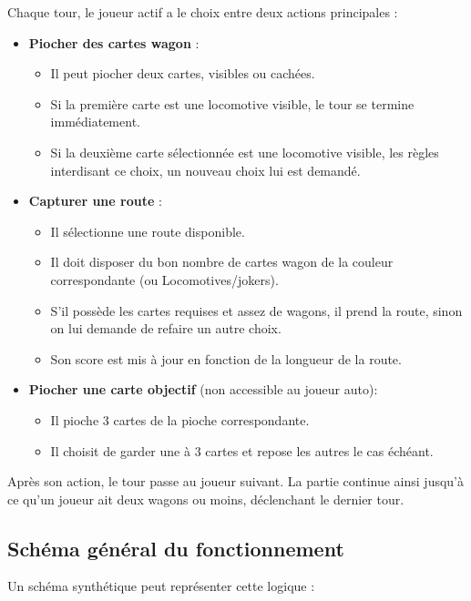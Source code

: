 \documentclass[a4paper,12pt]{report}
\begin{document}
Chaque tour, le joueur actif a le choix entre deux actions principales :
\begin{itemize}
    \item \textbf{Piocher des cartes wagon} :
        \begin{itemize}
            \item Il peut piocher deux cartes, visibles ou cachées.
            \item Si la première carte est une locomotive visible, le tour se termine immédiatement.
            \item Si la deuxième carte sélectionnée est une locomotive visible, les règles interdisant ce choix,
            un nouveau choix lui est demandé.
        \end{itemize}
    \item \textbf{Capturer une route} :
        \begin{itemize}
            \item Il sélectionne une route disponible.
            \item Il doit disposer du bon nombre de cartes wagon de la couleur correspondante (ou Locomotives/jokers).
            \item S’il possède les cartes requises et assez de wagons, il prend la route,
            sinon on lui demande de refaire un autre choix.
            \item Son score est mis à jour en fonction de la longueur de la route.
        \end{itemize}
    \item \textbf{Piocher une carte objectif} (non accessible au joueur auto):
        \begin{itemize}
            \item Il pioche 3 cartes de la pioche correspondante.
            \item Il choisit de garder une à 3 cartes et repose les autres le cas échéant.
        \end{itemize}
\end{itemize}

Après son action, le tour passe au joueur suivant. La partie continue ainsi jusqu'à ce qu'un joueur ait deux wagons
ou moins, déclenchant le dernier tour.

\subsection*{Schéma général du fonctionnement}

Un schéma synthétique peut représenter cette logique :
\end{document}
